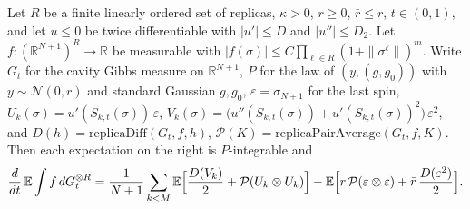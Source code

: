 \begin{theorem}\label{thm:sg-tal:st-cavity-derivative}
  \leanok
Let $R$ be a finite linearly ordered set of replicas, $\kappa>0$, $r\ge0$, $\bar r\le r$, $t\in(0,1)$, and let
$u\le0$ be twice differentiable with $|u'|\le D$ and $|u''|\le D_2$. Let $f:(\mathbb R^{N+1})^R\to\mathbb R$ be
measurable with $|f(\sigma)|\le C\prod_{\ell\in R}(1+\|\sigma^\ell\|)^m$. Write $G_t$ for the cavity Gibbs
measure on $\mathbb R^{N+1}$, $P$ for the law of $(y,(g,g_0))$ with $y\sim\mathcal N(0,r)$ and standard
Gaussian $g,g_0$, $\varepsilon=\sigma_{N+1}$ for the last spin,
$U_k(\sigma)=u'(S_{k,t}(\sigma))\,\varepsilon$, $V_k(\sigma)=\bigl(u''(S_{k,t}(\sigma))+u'(S_{k,t}(\sigma))^2\bigr)\,\varepsilon^2$,
and $D(h)=\mathrm{replicaDiff}(G_t,f,h)$, $\mathcal P(K)=\mathrm{replicaPairAverage}(G_t,f,K)$. Then each
expectation on the right is $P$-integrable and
\[
\frac d{dt}\,\mathbb E\int f\,dG_t^{\otimes R}
=\frac1{N+1}\sum_{k<M}\mathbb E\Bigl[\frac{D(V_k)}2+\mathcal P(U_k\otimes U_k)\Bigr]
-\mathbb E\Bigl[r\,\mathcal P(\varepsilon\otimes\varepsilon)+\bar r\,\frac{D(\varepsilon^2)}2\Bigr].
\]
\end{theorem}
